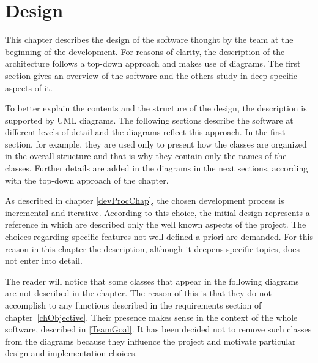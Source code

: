 \chapter{Design}\label{chDesign}
	This chapter describes the design of the software thought by the team at the beginning of the development.
	For reasons of clarity, the description of the architecture follows a top-down approach and makes use of diagrams. 		The first section gives an overview of the software and the others study in deep specific aspects of it.

	To better explain the contents and the structure of the design, the description is supported by \mbox{UML} diagrams. The following sections describe the software at different levels of detail and the diagrams reflect this approach. In the first section, for example, they are used only to present how the classes are organized in the overall structure and that is why they contain only the names of the classes. Further details are added in the diagrams in the next sections, according with the top-down approach of the chapter.

	As described in chapter \ref{devProcChap}, the chosen development process is incremental and iterative.
	According to this choice, the initial design represents a reference in which are described only the well known aspects of the project. The choices regarding specific features not well defined a-priori are demanded. For this reason in this chapter the description, although it deepens specific topics, does not enter into detail. 
		
	The reader will notice that some classes that appear in the following diagrams are not described in the chapter. The reason of this is that they do not accomplish to any functions described in the requirements section of \mbox{chapter \ref{chObjective}}. Their presence makes sense in the context of the whole software, described in \ref{TeamGoal}. It has been decided not to remove such classes from the diagrams because they influence the project and motivate particular design and implementation choices.

